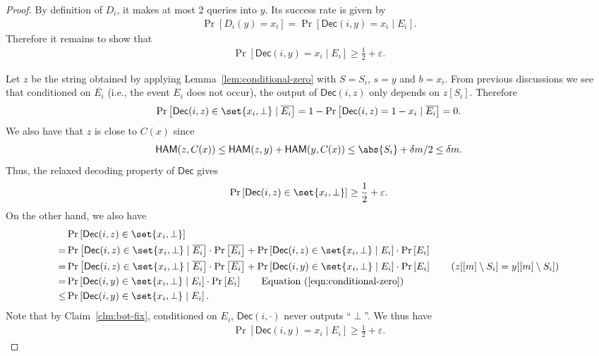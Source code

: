 \documentclass[10pt,a4paper]{article}
\theoremstyle{remark}
\newcommand{\eps}{\ensuremath{\varepsilon}}
\newcommand{\Dec}{\ensuremath{\mathsf{Dec}}\xspace}
\newcommand{\HAM}{\ensuremath{\mathsf{HAM}}}
\newcommand{\ham}{\HAM\xspace}
\begin{document}
\begin{proof}
	By definition of $D_i$, it makes at most 2 queries into $y$. Its success rate is given by
	\begin{align*}
	    \Pr[D_i(y) = x_i] = \Pr[\Dec(i,y) = x_i \mid E_i].
	\end{align*}
	Therefore it remains to show that
	\begin{align*}
		\Pr\left[ \Dec(i,y) = x_i \mid E_i \right] \ge \frac{1}{2} + \eps.
	\end{align*} 
	
	Let $z$ be the string obtained by applying Lemma~\ref{lem:conditional-zero} with $S=S_i$, $s=y$ and $b=x_i$. From previous discussions we see that conditioned on $\overline{E_i}$ (i.e., the event $E_i$ does not occur), the output of $\Dec(i,z)$ only depends on $z[S_i]$. Therefore
	\begin{align}
		\Pr\left[ \Dec(i, z) \in \set{x_i, \perp} \mid \overline{E_i} \right] = 1-\Pr\left[ \Dec(i, z) = 1-x_i \mid \overline{E_i} \right] = 0.
		\label{eqn:conditional-zero}
	\end{align}
	We also have that $z$ is close to $C(x)$ since
	\begin{align*}
	\ham(z, C(x)) \le \ham(z, y) + \ham(y, C(x)) \le \abs{S_i} + \delta m/2 \le \delta m.
	\end{align*}
	Thus, the relaxed decoding property of $\Dec$ gives
	\begin{align*}
	\Pr\left[ \Dec(i, z) \in \set{x_i, \perp} \right] \ge \frac{1}{2} + \eps.
	\end{align*}
	On the other hand, we also have
	\begin{align*}
	 & \Pr\left[ \Dec(i, z) \in \set{x_i, \perp} \right] \\
	=& \Pr\left[ \Dec(i, z) \in \set{x_i, \perp} \mid \overline{E_i} \right] \cdot \Pr\left[ \overline{E_i} \right] + \Pr\left[ \Dec(i, z) \in \set{x_i, \perp} \mid E_i \right] \cdot \Pr\left[ E_i \right] \\
	=& \Pr\left[ \Dec(i, z) \in \set{x_i, \perp} \mid \overline{E_i} \right] \cdot \Pr\left[ \overline{E_i} \right] + \Pr\left[ \Dec(i, y) \in \set{x_i, \perp} \mid E_i \right] \cdot \Pr\left[ E_i \right] \tag*{($z[[m]\setminus S_i]=y[[m]\setminus S_i]$)} \\
	=& \Pr\left[ \Dec(i, y) \in \set{x_i, \perp} \mid E_i \right] \cdot \Pr\left[ E_i \right]  \tag*{Equation (\ref{eqn:conditional-zero})}\\
	\le& \Pr\left[ \Dec(i, y) \in \set{x_i, \perp} \mid E_i \right].
	\end{align*}
	Note that by Claim~\ref{clm:bot-fix}, conditioned on $E_i$, $\Dec(i,\cdot)$ never outputs ``$\perp$''. We thus have 
	\begin{align*}
	\Pr\left[ \Dec(i, y) = x_i \mid E_i \right] \ge \frac{1}{2} + \eps.
	\end{align*}
\end{proof}
\end{document}
